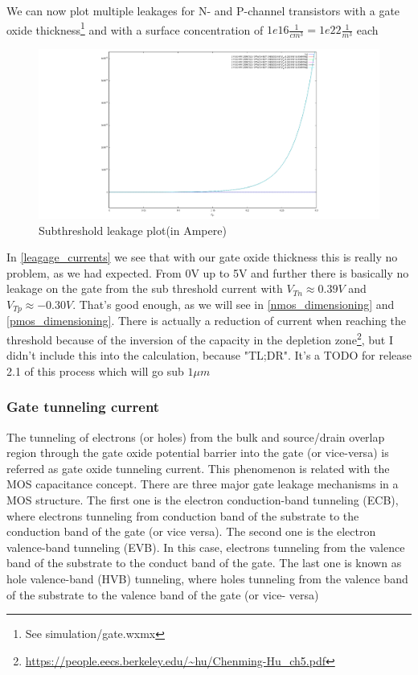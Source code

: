 We can now plot multiple leakages for N- and P-channel transistors with a gate oxide thickness\footnote{See simulation/gate.wxmx} and with a surface concentration of $1e16\frac{1}{cm^3}=1e22\frac{1}{m^3}$ each
\begin{figure}[H]
	\centering
	\includegraphics[width=\textwidth]{subthreshold_leagage.png}
	\caption{Subthreshold leakage plot(in Ampere)}
	\label{leagage_currents}
\end{figure}
In \autoref{leagage_currents} we see that with our gate oxide thickness this is really no problem, as we had expected.
From 0V up to 5V and further there is basically no leakage on the gate from the sub threshold current with $V_{Tn} \approx 0.39V$ and $V_{Tp} \approx -0.30V$.
That's good enough, as we will see in \autoref{nmos_dimensioning} and \autoref{pmos_dimensioning}.
There is actually a reduction of current when reaching the threshold because of the inversion of the capacity in the depletion zone\footnote{\url{https://people.eecs.berkeley.edu/~hu/Chenming-Hu_ch5.pdf}}, but I didn't include this into the calculation, because "TL;DR".
It's a TODO for release 2.1 of this process which will go sub $1 \mu m$

\subsubsection{Gate tunneling current}

The tunneling of electrons (or holes) from the bulk and source/drain overlap region through the gate oxide potential barrier into the gate (or vice-versa) is referred as gate oxide tunneling current.
This phenomenon is related with the MOS capacitance concept.
There are three major gate leakage mechanisms in a MOS structure.
The first one is the electron conduction-band tunneling (ECB), where electrons tunneling from conduction band of the substrate to the conduction band of the gate (or vice versa).
The second one is the electron valence-band tunneling (EVB). In this case, electrons tunneling from the valence band of the substrate to the conduct band of the gate.
The last one is known as hole valence-band (HVB) tunneling, where holes tunneling from the valence band of the substrate to the valence band of the gate (or vice- versa)

